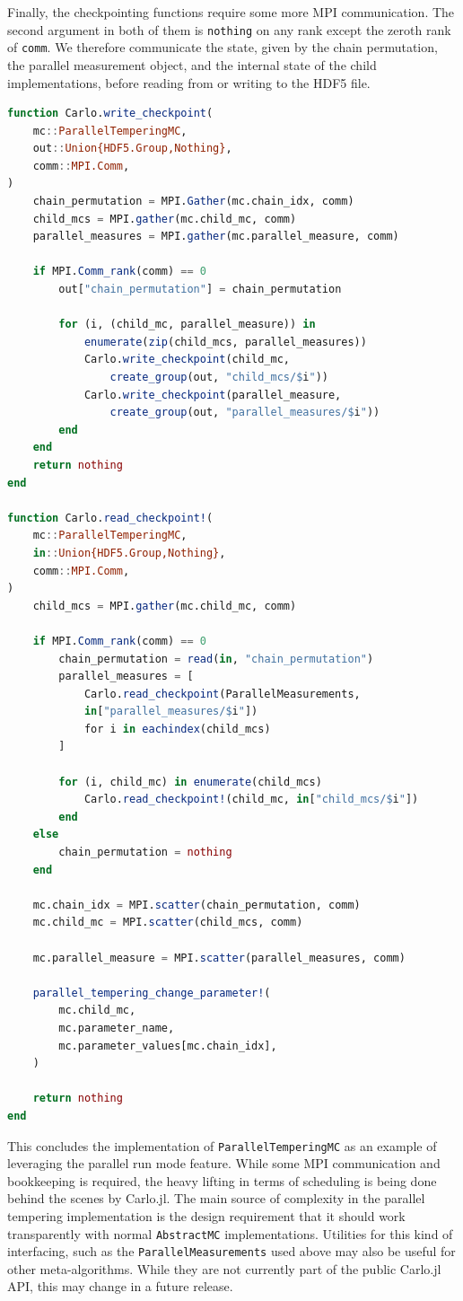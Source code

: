 \documentclass{SciPost}
\begin{document}
Finally, the checkpointing functions require some more MPI communication. The second argument in both of them is \texttt{nothing} on any rank except the zeroth rank of \texttt{comm}. We therefore communicate the state, given by the chain permutation, the parallel measurement object, and the internal state of the child implementations, before reading from or writing to the HDF5 file.
\begin{lstlisting}[language=julia]
function Carlo.write_checkpoint(
    mc::ParallelTemperingMC,
    out::Union{HDF5.Group,Nothing},
    comm::MPI.Comm,
)
    chain_permutation = MPI.Gather(mc.chain_idx, comm)
    child_mcs = MPI.gather(mc.child_mc, comm)
    parallel_measures = MPI.gather(mc.parallel_measure, comm)

    if MPI.Comm_rank(comm) == 0
        out["chain_permutation"] = chain_permutation

        for (i, (child_mc, parallel_measure)) in
            enumerate(zip(child_mcs, parallel_measures))
            Carlo.write_checkpoint(child_mc,
                create_group(out, "child_mcs/$i"))
            Carlo.write_checkpoint(parallel_measure,
                create_group(out, "parallel_measures/$i"))
        end
    end
    return nothing
end

function Carlo.read_checkpoint!(
    mc::ParallelTemperingMC,
    in::Union{HDF5.Group,Nothing},
    comm::MPI.Comm,
)
    child_mcs = MPI.gather(mc.child_mc, comm)

    if MPI.Comm_rank(comm) == 0
        chain_permutation = read(in, "chain_permutation")
        parallel_measures = [
            Carlo.read_checkpoint(ParallelMeasurements,
            in["parallel_measures/$i"])
            for i in eachindex(child_mcs)
        ]

        for (i, child_mc) in enumerate(child_mcs)
            Carlo.read_checkpoint!(child_mc, in["child_mcs/$i"])
        end
    else
        chain_permutation = nothing
    end

    mc.chain_idx = MPI.scatter(chain_permutation, comm)
    mc.child_mc = MPI.scatter(child_mcs, comm)

    mc.parallel_measure = MPI.scatter(parallel_measures, comm)

    parallel_tempering_change_parameter!(
        mc.child_mc,
        mc.parameter_name,
        mc.parameter_values[mc.chain_idx],
    )

    return nothing
end
\end{lstlisting}
This concludes the implementation of \texttt{ParallelTemperingMC} as an example of leveraging the parallel run mode feature. While some MPI communication and bookkeeping is required, the heavy lifting in terms of scheduling is being done behind the scenes by Carlo.jl. The main source of complexity in the parallel tempering implementation is the design requirement that it should work transparently with normal \texttt{AbstractMC} implementations. Utilities for this kind of interfacing, such as the \verb+ParallelMeasurements+ used above may also be useful for other meta-algorithms. While they are not currently part of the public Carlo.jl API, this may change in a future release.
\end{document}
